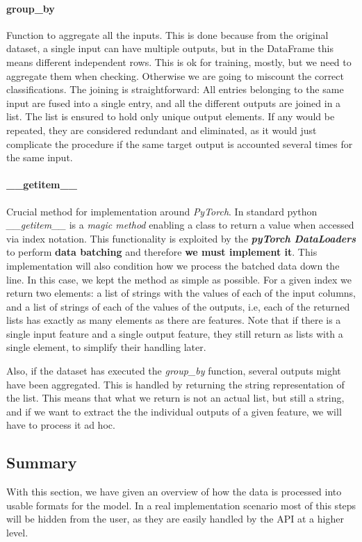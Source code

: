 \documentclass[a4paper, 11pt]{report}
\begin{document}
    \paragraph{group\_by} Function to aggregate all the inputs. This is done because from the original dataset, a single input can have multiple outputs, but in the DataFrame this means different independent rows. This is ok for training, mostly, but we need to aggregate them when checking. Otherwise we are going to miscount the correct classifications. The joining is straightforward: All entries belonging to the same input are fused into a single entry, and all the different outputs are joined in a list. The list is ensured to hold only unique output elements. If any would be repeated, they are considered redundant and eliminated, as it would just complicate the procedure if the same target output is accounted several times for the same input.

    \paragraph{\_\_getitem\_\_} Crucial method for implementation around \textit{PyTorch}. In standard python \textit{\_\_getitem\_\_} is a \textit{magic method} enabling a class to return a value when accessed via index notation. This functionality is exploited by the \textbf{\textit{pyTorch DataLoaders}} to perform \textbf{data batching} and therefore \textbf{we must implement it}. This implementation will also condition how we process the batched data down the line. In this case, we kept the method as simple as possible. For a given index we return two elements: a list of strings with the values of each of the input columns, and a list of strings of each of the values of the outputs, i.e, each of the returned lists has exactly as many elements as there are features. Note that if there is a single input feature and a single output feature, they still return as lists with a single element, to simplify their handling later.

    Also, if the dataset has executed the \textit{group\_by} function, several outputs might have been aggregated. This is handled by returning the string representation of the list. This means that what we return is not an actual list, but still a string, and if we want to extract the the individual outputs of a given feature, we will have to process it ad hoc.

    \subsection{Summary}
    With this section, we have given an overview of how the data is processed into usable formats for the model. In a real implementation scenario most of this steps will be hidden from the user, as they are easily handled by the API at a higher level.
\end{document}
